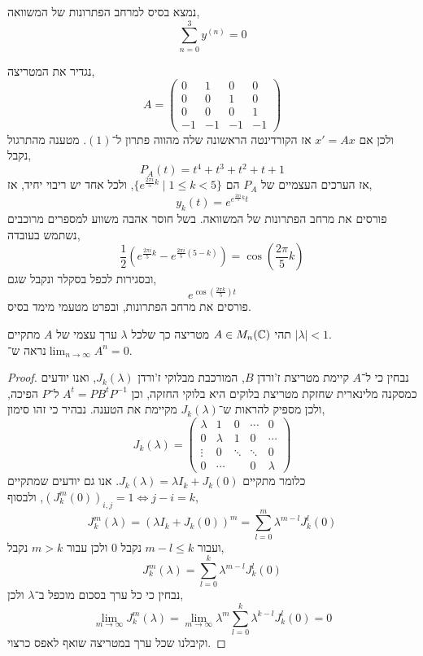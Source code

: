 \subquestion{}
נמצא בסיס למרחב הפתרונות של המשוואה,
\[
	\sum_{n = 0}^3 y^{(n)} = 0
	\tag{1}
\]
\begin{solution}
	נגדיר את המטריצה,
	\[
		A
		= \begin{pmatrix}
			0 & 1 & 0 & 0 \\
			0 & 0 & 1 & 0 \\
			0 & 0 & 0 & 1 \\
			-1 & -1 & -1 & -1
		\end{pmatrix}
	\]
	ולכן אם $x' = A x$ אז הקורדינטה הראשונה שלה מהווה פתרון ל־$(1)$.
	מטענה מהתרגול נקבל,
	\[
		P_A(t)
		= t^4 + t^3 + t^2 + t + 1
	\]
	אז הערכים העצמיים של $P_A$ הם $\{ e^{\frac{2 \pi i}{5}k} \mid 1 \le k < 5 \}$, ולכל אחד יש ריבוי יחיד, אז,
	\[
		y_k(t)
		= e^{e^{\frac{2 \pi i}{5}k} t}
	\]
	פורסים את מרחב הפתרונות של המשוואה.
	בשל חוסר אהבה משווע למספרים מרוכבים נשתמש בעובדה,
	\[
		\frac{1}{2} (e^{\frac{2 \pi i}{5} k} - e^{\frac{2 \pi i}{5} (5 - k)})
		= \cos(\frac{2 \pi}{5}k)
	\]
	ובסגירות לכפל בסקלר ונקבל שגם,
	\[
		e^{\cos(\frac{2 \pi k}{5}) t}
	\]
	פורסים את מרחב הפתרונות, ובפרט מטעמי מימד בסיס.
\end{solution}

\question{}
תהי $A \in M_n(\mathbb{C})$ מטריצה כך שלכל $\lambda$ ערך עצמי של $A$ מתקיים $|\lambda| < 1$. \\
נראה ש־$\lim_{n \to \infty} A^n = 0$.
\begin{proof}
	נבחין כי ל־$A$ קיימת מטריצת ז'ורדן $B$, המורכבת מבלוקי ז'ורדן $J_k(\lambda)$, ואנו יודעים כמסקנה מלינארית שחזקת מטריצת בלוקים היא בלוקי החזקה, וכן $A^t = P B^t P^{-1}$ ל־$P$ הפיכה,
	ולכן מספיק להראות ש־$J_k(\lambda)$ מקיימת את הטענה.
	נבהיר כי זהו סימון,
	\[
		J_k(\lambda)
		= \begin{pmatrix}
			\lambda & 1 & 0 & \cdots & 0 \\
			0 & \lambda & 1 & 0 & \cdots \\
			\vdots & 0 & \ddots & \ddots & 0 \\
			0 & \cdots && 0 & \lambda
		\end{pmatrix}
	\]
	כלומר מתקיים $J_k(\lambda) = \lambda I_k + J_k(0)$.
	אנו גם יודעים שמתקיים ${(J_k^m(0))}_{i, j} = 1 \iff j - i = k$, ולבסוף,
	\[
		J_k^m(\lambda)
		= {(\lambda I_k + J_k(0))}^m
		= \sum_{l = 0}^m \lambda^{m - l} J_k^l(0)
	\]
	ועבור $m - l \le k$ נקבל $0$ ולכן עבור $m > k$ נקבל,
	\[
		J_k^m(\lambda)
		= \sum_{l = 0}^k \lambda^{m - l} J_k^l(0)
	\]
	נבחין כי כל ערך בסכום מוכפל ב־$\lambda$ ולכן,
	\[
		\lim_{m \to \infty} J_k^m(\lambda)
		= \lim_{m \to \infty} \lambda^m \sum_{l = 0}^k \lambda^{k - l} J_k^l(0)
		= 0
	\]
	וקיבלנו שכל ערך במטריצה שואף לאפס כרצוי.
\end{proof}

